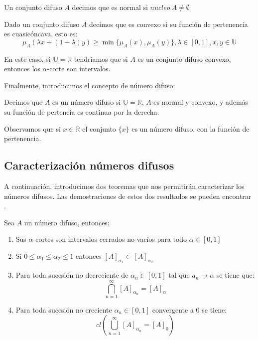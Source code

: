 \begin{definicion}
	Un conjunto difuso $A$ decimos que es normal si $nucleo ~ A \neq \emptyset$
\end{definicion}

\begin{definicion}
	Dado un conjunto difuso $A$ decimos que es convexo si su función de pertenencia es cuasicóncava, esto es:
	\[
		\mu_A(\lambda x + (1-\lambda)y) \geq \min{\{\mu_A(x), \mu_A(y)\}}, \lambda \in [0, 1], x, y \in \mathbb{U}
	\]
\end{definicion}

En este caso, si $\mathbb{U}=\mathbb{R}$ tendríamos que si $A$ es un conjunto difuso convexo, entonces los $\alpha$-corte son intervalos.

Finalmente, introducimos el concepto de número difuso:

\begin{definicion}
	Decimos que $A$ es un número difuso si $\mathbb{U}=\mathbb{R}$, $A$ es normal y convexo, y además su función de pertencia es continua por la derecha.
\end{definicion}

Observamos que si $x \in \mathbb{R}$ el conjunto $\{x\}$ es un número difuso, con la función de pertenencia.

\subsection{Caracterización números difusos}
A continuación, introducimos dos teoremas que nos permitirán caracterizar los números difusos. Las demostraciones de estos dos resultados se pueden encontrar \cite{apuntesfuzzy}.

\begin{teorema}
	Sea $A$ un número difuso, entonces:
	\begin{enumerate}
		\item Sus $\alpha$-cortes son intervalos cerrados no vacíos para todo $\alpha \in [0, 1]$
		\item Si $0 \leq \alpha_1 \leq \alpha_2 \leq 1$ entonces $[A]_{\alpha_1} \subset [A]_{\alpha_2}$
		\item Para toda sucesión no decreciente de $\alpha_n \in [0, 1]$ tal que $a_n \longrightarrow \alpha$ se tiene que:
		\[
			\bigcap^\infty_{n=1} [A]_{\alpha_n} = [A]_\alpha
		\]
		\item Para toda sucesión no creciente $\alpha_n \in [0, 1]$ convergente a $0$ se tiene:
		\[
			cl\left(
				\bigcup^\infty_{n=1} [A]_{\alpha_n} = [A]_0
			\right)
		\]
	\end{enumerate}
\end{teorema}
